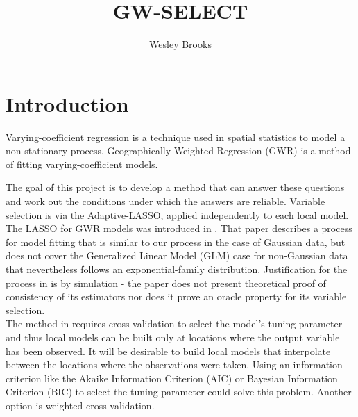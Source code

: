 \documentclass[authoryear, review, 11pt]{elsarticle}
\title{GW-SELECT}
\author{Wesley Brooks}
\date{}                                           %
\begin{document}
\maketitle





\section{Introduction}
	Varying-coefficient regression is a technique used in spatial statistics to model a non-stationary process. Geographically Weighted Regression (GWR) \cite{Fotheringham:2002} is a method of fitting varying-coefficient models. 

	The goal of this project is to develop a method that can answer these questions and work out the conditions under which the answers are reliable. Variable selection is via the Adaptive-LASSO, applied independently to each local model. The LASSO for GWR models was introduced in \cite{Wheeler:2009}. That paper describes a process for model fitting that is similar to our process in the case of Gaussian data, but does not cover the Generalized Linear Model (GLM) case for non-Gaussian data that nevertheless follows an exponential-family distribution. Justification for the process in \cite{Wheeler:2009} is by simulation - the paper does not present theoretical proof of consistency of its estimators nor does it prove an oracle property for its variable selection.\\
	
	The method in \cite{Wheeler:2009} requires cross-validation to select the model's tuning parameter and thus local models can be built only at locations where the output variable has been observed. It will be desirable to build local models that interpolate between the locations where the observations were taken. Using an information criterion like the Akaike Information Criterion (AIC) or Bayesian Information Criterion (BIC) to select the tuning parameter could solve this problem. Another option is weighted cross-validation.\\
\end{document}
